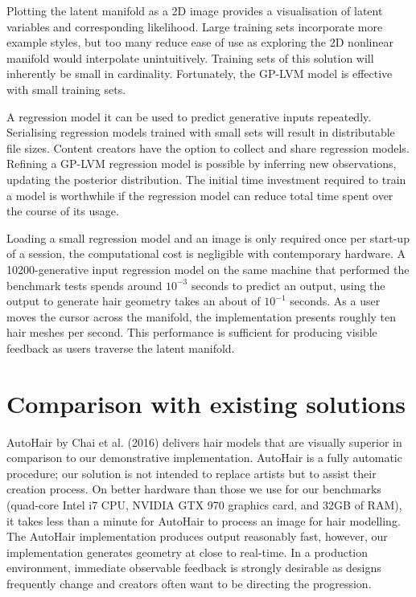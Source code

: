 \documentclass[ %
author={Dillon Keith Diep},
supervisor={Dr. Carl Henrik Ek},
degree={MEng},
title={ART-CG Hair:},
subtitle={Assisted Real-time Content Generation of Stylised Virtual Hair},
type={Research},
year={2017} ]{dissertation}
\begin{document}
Plotting the latent manifold as a 2D image provides a visualisation of latent variables and corresponding likelihood. Large training sets incorporate more example styles, but too many reduce ease of use as exploring the 2D nonlinear manifold would interpolate unintuitively. Training sets of this solution will inherently be small in cardinality. Fortunately, the GP-LVM model is effective with small training sets.

A regression model it can be used to predict generative inputs repeatedly. Serialising regression models trained with small sets will result in distributable file sizes. Content creators have the option to collect and share regression models. Refining a GP-LVM regression model is possible by inferring new observations, updating the posterior distribution. The initial time investment required to train a model is worthwhile if the regression model can reduce total time spent over the course of its usage.

Loading a small regression model and an image is only required once per start-up of a session, the computational cost is negligible with contemporary hardware. A 10200-generative input regression model on the same machine that performed the benchmark tests spends around $10^{-3}$ seconds to predict an output, using the output to generate hair geometry takes an about of $10^{-1}$ seconds. As a user moves the cursor across the manifold, the implementation presents roughly ten hair meshes per second. This performance is sufficient for producing visible feedback as users traverse the latent manifold.

\section{Comparison with existing solutions}
AutoHair by Chai et al. (2016) \cite{autohair} delivers hair models that are visually superior in comparison to our demonstrative implementation. AutoHair is a fully automatic procedure; our solution is not intended to replace artists but to assist their creation process. On better hardware than those we use for our benchmarks (quad-core Intel i7 CPU, NVIDIA GTX 970 graphics card, and 32GB of RAM), it takes less than a minute for AutoHair to process an image for hair modelling. The AutoHair implementation produces output reasonably fast, however, our implementation generates geometry at close to real-time. In a production environment, immediate observable feedback is strongly desirable as designs frequently change and creators often want to be directing the progression. 
\end{document}
